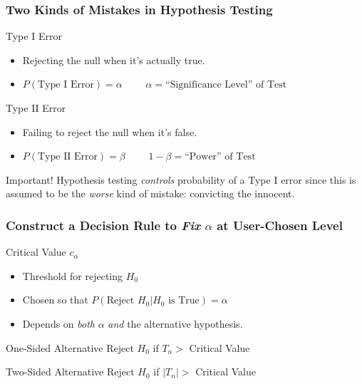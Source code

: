\documentclass[handout]{beamer}
\begin{document}
\begin{frame}
	\frametitle{Two Kinds of Mistakes in Hypothesis Testing}
	\begin{block}
		{Type I Error}
		\begin{itemize}
			\item Rejecting the null when it's actually true.
			\item $P(\mbox{Type I Error}) = \alpha\quad \quad$ 
			\alert{$\boxed{\alpha= \mbox{``Significance Level'' of Test}}$}
		\end{itemize}
	\end{block}
	 \begin{block}
		{Type II Error}
		\begin{itemize}
			\item Failing to reject the null when it's false.
			\item $P(\mbox{Type II Error}) = \beta \quad \quad$ 
			\alert{$\boxed{1 - \beta= \mbox{``Power'' of Test}}$}
		\end{itemize}
	\end{block}
	\begin{alertblock}
		{Important!}
		Hypothesis testing \emph{controls} probability of a Type I error since this is assumed to be the \emph{worse} kind of mistake: convicting the innocent.	
	\end{alertblock}
\end{frame}
\begin{frame}
	\frametitle{Construct a Decision Rule to \emph{Fix} $\alpha$ at User-Chosen Level}

	\begin{block}
		{Critical Value $c_{\alpha}$} 
	\begin{itemize}
		\item Threshold for rejecting $H_0$
		\item Chosen so that $P(\mbox{Reject } H_0|H_0 \mbox{ is True}) = \alpha$
		\item Depends on \emph{both} $\alpha$ \emph{and} the alternative hypothesis.
	\end{itemize}
	\end{block}
	\begin{block}
		{One-Sided Alternative}
		Reject $H_0$ if $T_n >$ Critical Value
	\end{block}
	\begin{block}
		{Two-Sided Alternative}
		Reject $H_0$ if $|T_n| >$ Critical Value
	\end{block}
\end{frame}
\end{document}
